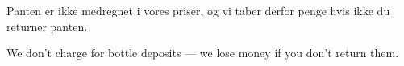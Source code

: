 \documentclass{article}
\begin{document}
\maketitle

\null
\vspace{-1cm}


\huge

\begin{center}

\vspace{-0.8cm}

Panten er ikke medregnet i vores priser, og vi taber derfor penge hvis ikke du
returner panten.

\english


\english

\vspace{-1cm}

We don't charge for bottle deposits --- we lose money if you don't return them.

\end{center}

\dansk

\underskriv
\end{document}

